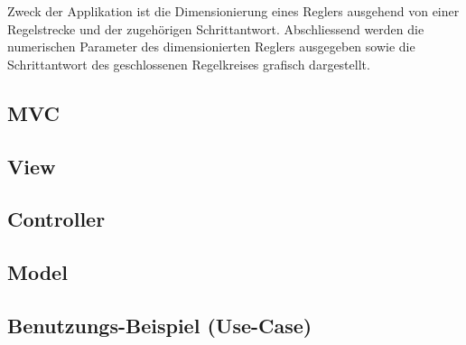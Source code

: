 
Zweck  der Applikation  ist die  Dimensionierung eines  Reglers ausgehend  von
einer Regelstrecke und  der zugeh\"origen Schrittantwort. Abschliessend werden
die  numerischen Parameter  des dimensionierten  Reglers ausgegeben  sowie die
Schrittantwort des geschlossenen Regelkreises grafisch dargestellt.


\subsection{MVC}
\label{subs:mvc}


\subsection{View}
\label{subs:view}



\subsection{Controller}



\subsection{Model}



\subsection{Benutzungs-Beispiel (Use-Case)}

